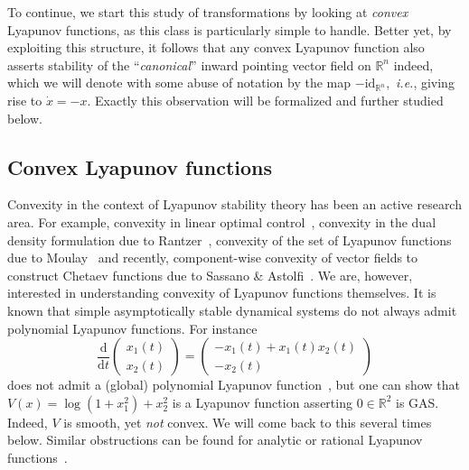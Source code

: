 \documentclass[letterpaper, 10 pt, conference]{ieeeconf}  %
\theoremstyle{mystyle}
\begin{document}
To continue, we start this study of transformations by looking at \textit{convex} Lyapunov functions, as this class is particularly simple to handle. Better yet, by exploiting this structure, it follows that any convex Lyapunov function also asserts stability of the ``\textit{canonical}'' inward pointing vector field on $\mathbb{R}^n$ indeed, which we will denote with some abuse of notation by the map $-\mathrm{id}_{\mathbb{R}^n}$,~\textit{i.e.}, giving rise to $\dot{x}=-x$. Exactly this observation will be formalized and further studied below. 

\subsection{Convex Lyapunov functions}
Convexity in the context of Lyapunov stability theory has been an active research area.
For example, convexity in linear optimal control~\cite{AREbook}, convexity in the dual density formulation due to Rantzer~\cite{ref:prajna2004nonlinear}, convexity of the set of Lyapunov functions due to Moulay~\cite{ref:moulay2010some} {and recently, component-wise convexity of vector fields to construct Chetaev functions due to Sassano \& Astolfi~\cite{sassano2023role}}. We are, however, interested in understanding convexity of Lyapunov functions themselves. It is known that simple asymptotically stable dynamical systems do not always admit polynomial Lyapunov functions. For instance
\begin{equation}
\label{equ:ahmadi}
    \frac{\mathrm{d}}{\mathrm{d}t}\begin{pmatrix}
        x_1(t)\\ x_2(t)
    \end{pmatrix} = \begin{pmatrix}
        -x_1(t)+x_1(t)x_2(t)\\ -x_2(t)
    \end{pmatrix}
\end{equation}
does not admit a (global) polynomial Lyapunov function~\cite{ref:ahmadi2011globally}, but one can show that $V(x)=\log(1+x_1^2)+x_2^2$ is a Lyapunov function asserting $0\in \mathbb{R}^2$ is GAS. Indeed, $V$ is smooth, yet \textit{not} convex. We will come back to this several times below.
Similar obstructions can be found for analytic or rational Lyapunov functions~\cite{ref:bacciotti2005liapunov,ref:ahmadi2018globally}. 
\end{document}
